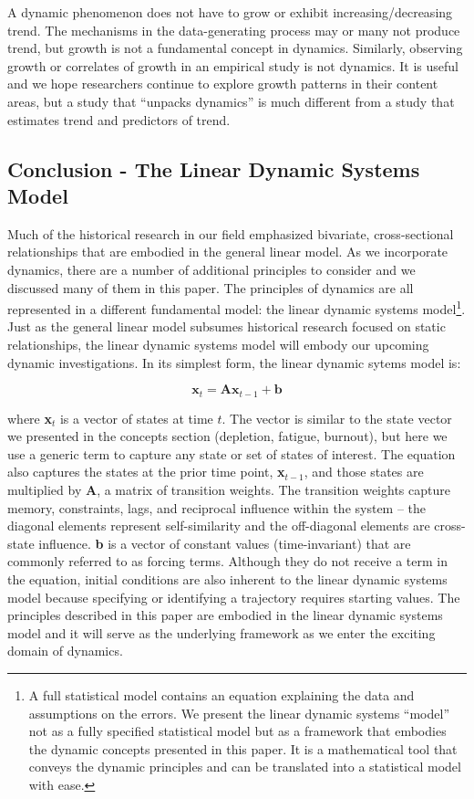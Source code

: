 \documentclass[english,,man]{apa6}
\let\rmarkdownfootnote\footnote%
\def\footnote{\protect\rmarkdownfootnote}
\begin{document}
A dynamic phenomenon does not have to grow or exhibit increasing/decreasing trend. The mechanisms in the data-generating process may or many not produce trend, but growth is not a fundamental concept in dynamics. Similarly, observing growth or correlates of growth in an empirical study is not dynamics. It is useful and we hope researchers continue to explore growth patterns in their content areas, but a study that \enquote{unpacks dynamics} is much different from a study that estimates trend and predictors of trend.

\hypertarget{conclusion---the-linear-dynamic-systems-model}{%
\subsection{Conclusion - The Linear Dynamic Systems Model}\label{conclusion---the-linear-dynamic-systems-model}}

Much of the historical research in our field emphasized bivariate, cross-sectional relationships that are embodied in the general linear model. As we incorporate dynamics, there are a number of additional principles to consider and we discussed many of them in this paper. The principles of dynamics are all represented in a different fundamental model: the linear dynamic systems model\footnote{A full statistical model contains an equation explaining the data and assumptions on the errors. We present the linear dynamic systems \enquote{model} not as a fully specified statistical model but as a framework that embodies the dynamic concepts presented in this paper. It is a mathematical tool that conveys the dynamic principles and can be translated into a statistical model with ease.}. Just as the general linear model subsumes historical research focused on static relationships, the linear dynamic systems model will embody our upcoming dynamic investigations. In its simplest form, the linear dynamic sytems model is:

\begin{equation}
\textbf{x}_t = \textbf{A} \textbf{x}_{t-1} + \textbf{b}
\end{equation}

\noindent where \textbf{x}\(_t\) is a vector of states at time \(t\). The vector is similar to the state vector we presented in the concepts section (depletion, fatigue, burnout), but here we use a generic term to capture any state or set of states of interest. The equation also captures the states at the prior time point, \textbf{x}\(_{t-1}\), and those states are multiplied by \textbf{A}, a matrix of transition weights. The transition weights capture memory, constraints, lags, and reciprocal influence within the system -- the diagonal elements represent self-similarity and the off-diagonal elements are cross-state influence. \textbf{b} is a vector of constant values (time-invariant) that are commonly referred to as forcing terms. Although they do not receive a term in the equation, initial conditions are also inherent to the linear dynamic systems model because specifying or identifying a trajectory requires starting values. The principles described in this paper are embodied in the linear dynamic systems model and it will serve as the underlying framework as we enter the exciting domain of dynamics.
\end{document}
